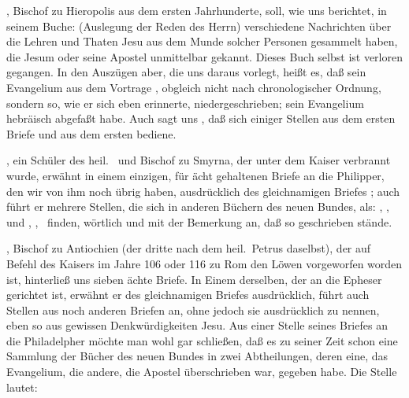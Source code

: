 \begin{aufza}
\item {}, Bischof zu Hieropolis aus dem ersten Jahrhunderte, soll, wie uns  berichtet, in seinem Buche:  (Auslegung der Reden des Herrn) verschiedene Nachrichten über die Lehren und Thaten Jesu aus dem Munde solcher Personen gesammelt haben, die Jesum oder seine Apostel unmittelbar gekannt. Dieses Buch selbst ist verloren gegangen. In den Auszügen aber, die uns  daraus vorlegt, heißt es, daß  sein Evangelium aus dem Vortrage , obgleich nicht nach chronologischer Ordnung, sondern so, wie er sich eben erinnerte, niedergeschrieben;  sein Evangelium hebräisch abgefaßt habe. Auch sagt uns , daß sich  einiger Stellen aus dem ersten Briefe  und aus dem ersten  bediene.~
\item {}, ein Schüler des heil.\  und Bischof zu Smyrna, der unter dem Kaiser  verbrannt wurde, erwähnt in einem einzigen, für ächt gehaltenen Briefe an die Philipper, den wir von ihm noch übrig haben, ausdrücklich des gleichnamigen Briefes ; auch führt er mehrere Stellen, die sich in anderen Büchern des neuen Bundes, als: , ,  und , , \ finden, wörtlich und mit der Bemerkung an, daß so  geschrieben stände.
\item {}, Bischof zu Antiochien (der dritte nach dem heil.\ Petrus daselbst), der auf Befehl des Kaisers  im Jahre 106 oder 116 zu Rom den Löwen vorgeworfen worden ist, hinterließ uns sieben ächte Briefe. In Einem derselben, der an die Epheser gerichtet ist, erwähnt er des gleichnamigen Briefes  ausdrücklich, führt auch Stellen aus noch anderen Briefen an, ohne jedoch sie ausdrücklich zu nennen, eben so aus gewissen Denkwürdigkeiten Jesu. Aus einer Stelle seines Briefes an die Philadelpher möchte man wohl gar schließen, daß es zu seiner Zeit schon eine Sammlung der Bücher des neuen Bundes in zwei Abtheilungen, deren eine, das Evangelium, die andere, die Apostel überschrieben war, gegeben habe. Die Stelle lautet:


\end{aufza}
